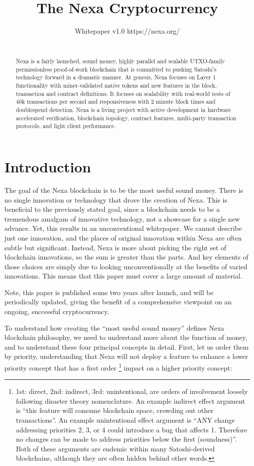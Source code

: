 \documentclass[a4paper, 11pt]{article}
\title{The Nexa Cryptocurrency}
\author{
    \begin{center}
        Whitepaper v1.0 \quad https://nexa.org/
    \end{center}\\
}
\begin{document}
\maketitle

\begin{abstract}
    Nexa is a fairly launched, sound money, highly parallel and scalable UTXO-family permissionless proof-of-work blockchain that is committed to pushing Satoshi’s technology forward in a dramatic manner.  At genesis, Nexa focuses on Layer 1 functionality with miner-validated native tokens and new features in the block, transaction and contract definitions.  It focuses on scalability with real-world tests of 40k transactions per second and responsiveness with 2 minute block times and doublespend detection.  Nexa is a living project with active development in hardware accelerated verification, blockchain topology, contract features, multi-party transaction protocols, and light client performance.

\end{abstract}
\section{Introduction}
The goal of the Nexa blockchain is to be the most useful sound money.  There is no single innovation or technology that drove the creation of Nexa.  This is beneficial to the previously stated goal, since a blockchain needs to be a tremendous amalgam of innovative technology, not a showcase for a single new advance.  Yet, this results in an unconventional whitepaper.  We cannot describe just one innovation, and the places of original innovation within Nexa are often subtle but significant.  Instead, Nexa is more about picking the right set of blockchain innovations, so the sum is greater than the parts.  And key elements of those choices are simply due to looking unconventionally at the benefits of varied innovations.  This means that this paper must cover a large amount of material. 

Note, this paper is published some two years  after launch, and will be periodically updated, giving the benefit of a comprehensive viewpoint on an ongoing, successful cryptocurrency.

To understand how creating the “most useful sound money” defines Nexa blockchain philosophy, we need to understand more about the function of money, and to understand these four principal concepts in detail.  First, let us order them by priority, understanding that Nexa will not deploy a feature to enhance a lower priority concept that has a first order \footnote{1st: direct, 2nd: indirect, 3rd: unintentional, are orders of involvement loosely following disaster theory nomenclature.  An example indirect effect argument is “this feature will consume blockchain space, crowding out other transactions”.  An example unintentional effect argument is “ANY change addressing priorities 2, 3, or 4 could introduce a bug that affects 1.  Therefore no changes can be made to address priorities below the first (soundness)”.  Both of these arguments are endemic within many Satoshi-derived blockchains, although they are often hidden behind other words.} impact on a higher priority concept:
\end{document}
